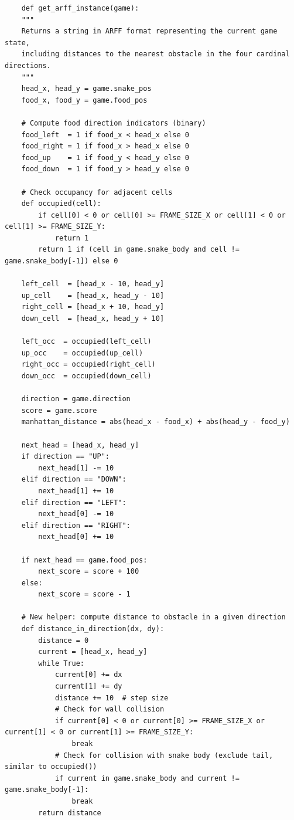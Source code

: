 \documentclass[12pt,a4paper]{article}
\begin{document}
\begin{verbatim}
    def get_arff_instance(game):
    """
    Returns a string in ARFF format representing the current game state,
    including distances to the nearest obstacle in the four cardinal directions.
    """
    head_x, head_y = game.snake_pos
    food_x, food_y = game.food_pos

    # Compute food direction indicators (binary)
    food_left  = 1 if food_x < head_x else 0
    food_right = 1 if food_x > head_x else 0
    food_up    = 1 if food_y < head_y else 0
    food_down  = 1 if food_y > head_y else 0

    # Check occupancy for adjacent cells
    def occupied(cell):
        if cell[0] < 0 or cell[0] >= FRAME_SIZE_X or cell[1] < 0 or cell[1] >= FRAME_SIZE_Y:
            return 1
        return 1 if (cell in game.snake_body and cell != game.snake_body[-1]) else 0

    left_cell  = [head_x - 10, head_y]
    up_cell    = [head_x, head_y - 10]
    right_cell = [head_x + 10, head_y]
    down_cell  = [head_x, head_y + 10]

    left_occ  = occupied(left_cell)
    up_occ    = occupied(up_cell)
    right_occ = occupied(right_cell)
    down_occ  = occupied(down_cell)

    direction = game.direction
    score = game.score
    manhattan_distance = abs(head_x - food_x) + abs(head_y - food_y)

    next_head = [head_x, head_y]
    if direction == "UP":
        next_head[1] -= 10
    elif direction == "DOWN":
        next_head[1] += 10
    elif direction == "LEFT":
        next_head[0] -= 10
    elif direction == "RIGHT":
        next_head[0] += 10

    if next_head == game.food_pos:
        next_score = score + 100
    else:
        next_score = score - 1

    # New helper: compute distance to obstacle in a given direction
    def distance_in_direction(dx, dy):
        distance = 0
        current = [head_x, head_y]
        while True:
            current[0] += dx
            current[1] += dy
            distance += 10  # step size
            # Check for wall collision
            if current[0] < 0 or current[0] >= FRAME_SIZE_X or current[1] < 0 or current[1] >= FRAME_SIZE_Y:
                break
            # Check for collision with snake body (exclude tail, similar to occupied())
            if current in game.snake_body and current != game.snake_body[-1]:
                break
        return distance


\end{verbatim}
\end{document}
